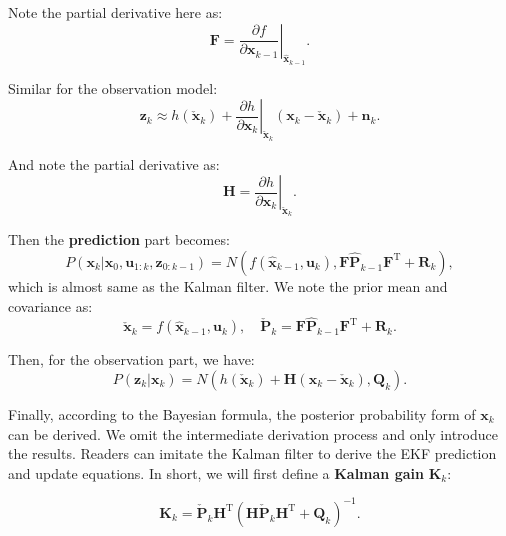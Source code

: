 Note the partial derivative here as:
\begin{equation}
	\mathbf{F} = \left. {\frac{{\partial f}}{{\partial {\mathbf{x}_{k - 1}}}}} \right|_{{{\mathbf{\hat x}}_{k - 1}}}.
\end{equation}

Similar for the observation model:
\begin{equation}
	{\mathbf{z}_k} \approx h\left( {{{\mathbf{\check x}}_k}} \right) + {\left. {\frac{{\partial h}}{{\partial {\mathbf{x}_k}}}} \right|_{{{\mathbf{\check x}}_k}}}\left( {\mathbf{x}_k - {{\mathbf{\check x}}_k}} \right) + {\mathbf{n}_k}.
\end{equation}

And note the partial derivative as:
\begin{equation}
	\mathbf{H} = \left. {\frac{{\partial h}}{{\partial {\mathbf{x}_k}}}} \right|_{{{\mathbf{\check x}}_k}}.
\end{equation}

Then the \textbf{prediction} part becomes:
\begin{equation}
	P\left( {{\mathbf{x}_k}|{\mathbf{x}_0},{\mathbf{u}_{1:k}},{\mathbf{z}_{0:k - 1}}} \right)
	= N(f\left( {{{\mathbf{\hat x}}_{k - 1}},{\mathbf{u}_k}} \right), \mathbf{F}\mathbf{\hat{P}}_{k-1} \mathbf{F}^\mathrm{T} + \mathbf{R}_k),
\end{equation}
which is almost same as the Kalman filter. We note the prior mean and covariance as:
\begin{equation}
	\mathbf{\check {x}}_k = f\left( {{{\mathbf{\hat x}}_{k - 1}},{\mathbf{u}_k}} \right), \quad \mathbf{\check{P}}_k = \mathbf{F}\mathbf{\hat{P}}_{k-1} \mathbf{F}^\mathrm{T} + \mathbf{R}_k.
\end{equation}

Then, for the observation part, we have: 
\begin{equation}
	P\left( {{\mathbf{z}_k}|{\mathbf{x}_k}} \right) = N( h\left( {{{\mathbf{\check x}}_k}} \right) + \mathbf{H} \left( {\mathbf{x}_k - {{\mathbf{\check x}}_k}} \right), \mathbf{Q}_k ).
\end{equation}

Finally, according to the Bayesian formula, the posterior probability form of $\mathbf{x}_k$ can be derived. We omit the intermediate derivation process and only introduce the results. Readers can imitate the Kalman filter to derive the EKF prediction and update equations. In short, we will first define a \textbf{Kalman gain} $\mathbf{K}_k$:

\begin{equation}
	\mathbf{K}_k = {\mathbf{\check{P}}_{k}}{\mathbf{H}^\mathrm{T}}{\left( {\mathbf{H}{\mathbf{\check P}_k}{\mathbf{H}^\mathrm{T}} + {\mathbf{Q}_k}} \right)^{ - 1}}.
\end{equation}

